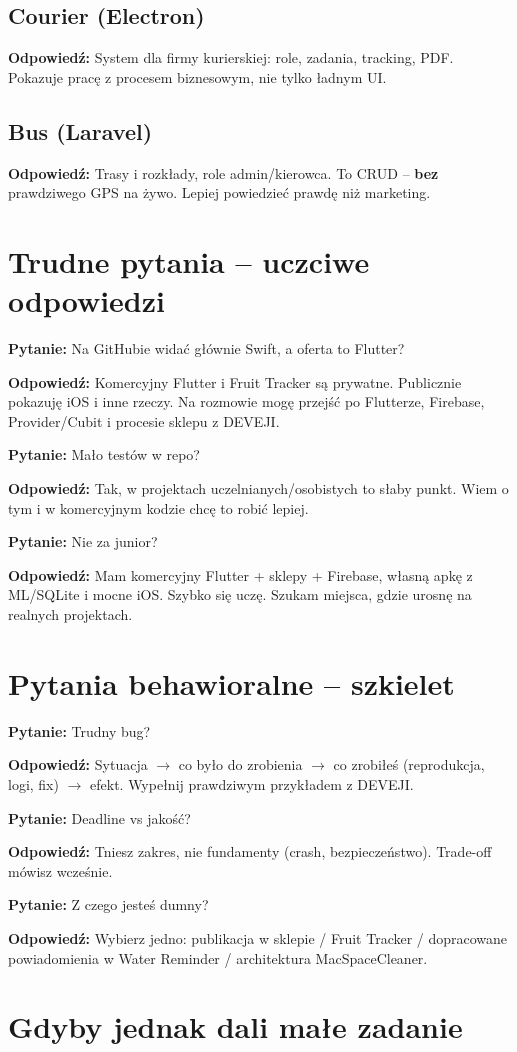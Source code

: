 \documentclass[11pt,a4paper]{article}
\newcommand{\pyt}[1]{\par\medskip\noindent\textbf{Pytanie:} #1\par}
\newcommand{\odp}[1]{\noindent\textbf{Odpowiedź:} #1\par}
\begin{document}
\subsection{Courier (Electron)}
\odp{System dla firmy kurierskiej: role, zadania, tracking, PDF. Pokazuje pracę z procesem biznesowym, nie tylko ładnym UI.}

\subsection{Bus (Laravel)}
\odp{Trasy i rozkłady, role admin/kierowca. To CRUD -- \textbf{bez} prawdziwego GPS na żywo. Lepiej powiedzieć prawdę niż marketing.}

\section{Trudne pytania -- uczciwe odpowiedzi}

\pyt{Na GitHubie widać głównie Swift, a oferta to Flutter?}
\odp{Komercyjny Flutter i Fruit Tracker są prywatne. Publicznie pokazuję iOS i inne rzeczy. Na rozmowie mogę przejść po Flutterze, Firebase, Provider/Cubit i procesie sklepu z DEVEJI.}

\pyt{Mało testów w repo?}
\odp{Tak, w projektach uczelnianych/osobistych to słaby punkt. Wiem o tym i w komercyjnym kodzie chcę to robić lepiej.}

\pyt{Nie za junior?}
\odp{Mam komercyjny Flutter + sklepy + Firebase, własną apkę z ML/SQLite i mocne iOS. Szybko się uczę. Szukam miejsca, gdzie urosnę na realnych projektach.}

\section{Pytania behawioralne -- szkielet}

\pyt{Trudny bug?}
\odp{Sytuacja $\to$ co było do zrobienia $\to$ co zrobiłeś (reprodukcja, logi, fix) $\to$ efekt. Wypełnij prawdziwym przykładem z DEVEJI.}

\pyt{Deadline vs jakość?}
\odp{Tniesz zakres, nie fundamenty (crash, bezpieczeństwo). Trade-off mówisz wcześnie.}

\pyt{Z czego jesteś dumny?}
\odp{Wybierz jedno: publikacja w sklepie / Fruit Tracker / dopracowane powiadomienia w Water Reminder / architektura MacSpaceCleaner.}

\section{Gdyby jednak dali małe zadanie}
\end{document}
